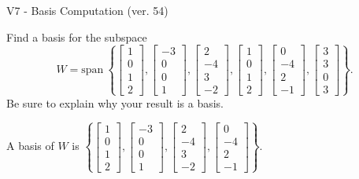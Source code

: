 \begin{exercise}
  \begin{exerciseTitle}V7 - Basis Computation (ver. 54)\end{exerciseTitle}
  \begin{exerciseStatement}
    Find a basis for the subspace 
\[W=\mathrm{span}\ \left\{\left[\begin{array}{r}
1 \\
0 \\
1 \\
2
\end{array}\right] , \left[\begin{array}{r}
-3 \\
0 \\
0 \\
1
\end{array}\right] , \left[\begin{array}{r}
2 \\
-4 \\
3 \\
-2
\end{array}\right] , \left[\begin{array}{r}
1 \\
0 \\
1 \\
2
\end{array}\right] , \left[\begin{array}{r}
0 \\
-4 \\
2 \\
-1
\end{array}\right] , \left[\begin{array}{r}
3 \\
3 \\
0 \\
3
\end{array}\right]\right\}.\]
 Be sure to explain why your result is a basis.


  \end{exerciseStatement}
  \begin{exerciseAnswer}
   A basis of \(W\) is  \(\left\{\left[\begin{array}{r}
1 \\
0 \\
1 \\
2
\end{array}\right] , \left[\begin{array}{r}
-3 \\
0 \\
0 \\
1
\end{array}\right] , \left[\begin{array}{r}
2 \\
-4 \\
3 \\
-2
\end{array}\right] , \left[\begin{array}{r}
0 \\
-4 \\
2 \\
-1
\end{array}\right]\right\}\).
  


  \end{exerciseAnswer}
\end{exercise}
